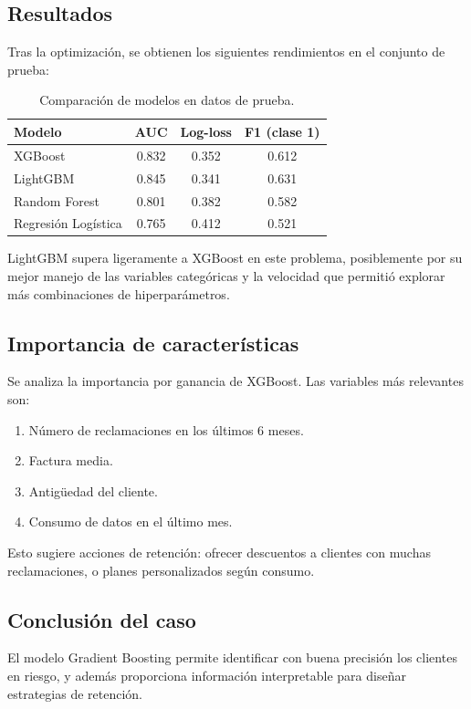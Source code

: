 \documentclass[12pt,a4paper,openany,oneside]{book}
\begin{document}
\subsection{Resultados}
Tras la optimización, se obtienen los siguientes rendimientos en el conjunto de prueba:

\begin{table}[h]
\centering
\begin{tabular}{l|c|c|c}
\textbf{Modelo} & \textbf{AUC} & \textbf{Log-loss} & \textbf{F1 (clase 1)} \\
\hline
XGBoost & 0.832 & 0.352 & 0.612 \\
LightGBM & 0.845 & 0.341 & 0.631 \\
Random Forest & 0.801 & 0.382 & 0.582 \\
Regresión Logística & 0.765 & 0.412 & 0.521 \\
\end{tabular}
\caption{Comparación de modelos en datos de prueba.}
\end{table}

LightGBM supera ligeramente a XGBoost en este problema, posiblemente por su mejor manejo de las variables categóricas y la velocidad que permitió explorar más combinaciones de hiperparámetros.

\subsection{Importancia de características}
Se analiza la importancia por ganancia de XGBoost. Las variables más relevantes son:
\begin{enumerate}
    \item Número de reclamaciones en los últimos 6 meses.
    \item Factura media.
    \item Antigüedad del cliente.
    \item Consumo de datos en el último mes.
\end{enumerate}
Esto sugiere acciones de retención: ofrecer descuentos a clientes con muchas reclamaciones, o planes personalizados según consumo.

\subsection{Conclusión del caso}
El modelo Gradient Boosting permite identificar con buena precisión los clientes en riesgo, y además proporciona información interpretable para diseñar estrategias de retención.
\end{document}
